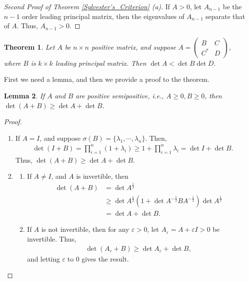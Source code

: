 \documentclass[11pt]{book}
\newtheorem{theorem}{Theorem}[chapter]
\newtheorem{lemma}[theorem]{Lemma}
\theoremstyle{definition}
\numberwithin{equation}{chapter}
\begin{document}
\begin{proof}[Second Proof of Theorem \ref{Sylvester's_Criterion} (a)]
If $A > 0$, let $A_{n-1}$ be the $n-1$ order leading principal matrix, then the eigenvalues of $A_{n-1}$ separate that of $A$. Thus, $A_{n-1} > 0$.
\end{proof}

\medskip

\begin{theorem}\label{block_matrix_inequality}
Let $A$ be $n \times n$ positive matrix, and suppose $A = \begin{pmatrix} B & C \\ C^* & D \end{pmatrix}$, where $B$ is $k \times k$ leading principal matrix. Then $\det A < \det B \det D$.
\end{theorem}

First we need a lemma, and then we provide a proof to the theorem.

\begin{lemma}
If $A$ and $B$ are positive semipositive, i.e., $A \geq 0, B \geq 0$, then $\det(A + B) \geq \det A + \det B$.
\end{lemma}
\begin{proof}
~\begin{enumerate}[label=(\alph*)]
    \item If $A = I$, and suppose $\sigma(B) = \{\lambda_1, \cdots, \lambda_n\}$. Then,
    \begin{align*}
        \det(I + B) = \prod^n_{i=1} (1 + \lambda_i) \geq 1 + \prod^n_{i=1} \lambda_i = \det I + \det B.
    \end{align*}
    Thus, $\det(A + B) \geq \det A + \det B$.
    
    \item 
    \begin{enumerate}[label=\arabic*)]
        \item If $A \neq I$, and $A$ is invertible, then
        \begin{align*}
            \det (A + B) & = \det A^{\frac{1}{2}} \\
            & \geq \det A^{\frac{1}{2}} \left(1 + \det A^{-\frac{1}{2}} B A^{-\frac{1}{2}} \right) \det A^{\frac{1}{2}} \\
            & = \det A + \det B.
        \end{align*}
        
        \item If $A$ is not invertible, then for any $\varepsilon > 0$, let $A_\varepsilon = A + \varepsilon I > 0$ be invertible. Thus, 
        \begin{align*}
            \det (A_\varepsilon + B) \geq \det A_\varepsilon + \det B,
        \end{align*}
        and letting $\varepsilon$ to $0$ gives the result.
    \end{enumerate}
\end{enumerate}
\end{proof}
\end{document}
